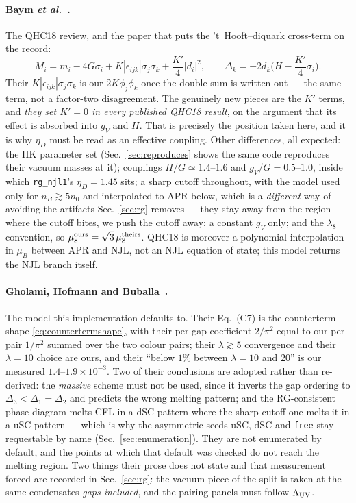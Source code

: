 \documentclass[aps,prc,onecolumn,superscriptaddress,nofootinbib,10pt]{revtex4-2}
\newcommand{\nB}{n_B}
\newcommand{\muB}{\mu_B}
\newcommand{\Lam}{\Lambda}
\begin{document}
\paragraph{Baym \textit{et al.}~\cite{Baym2018}.} The QHC18 review, and the
paper that puts the 't~Hooft--diquark cross-term on the record:
\begin{equation}
  M_i = m_i - 4G\sigma_i + K|\epsilon_{ijk}|\sigma_j\sigma_k
        + \frac{K'}{4}|d_i|^2 , \qquad
  \Delta_k = -2d_k\Big(H - \frac{K'}{4}\sigma_i\Big) .
\end{equation}
Their $K|\epsilon_{ijk}|\sigma_j\sigma_k$ is our $2K\phi_j\phi_k$ once the
double sum is written out --- the same term, not a factor-two disagreement.
The genuinely new pieces are the $K'$ terms, and \emph{they set $K' = 0$ in
every published QHC18 result}, on the argument that its effect is absorbed into
$g_V$ and $H$. That is precisely the position taken here, and it is why
$\eta_D$ must be read as an effective coupling. Other differences, all
expected: the HK parameter set (Sec.~\ref{sec:reproduces} shows the same code
reproduces their vacuum masses at it); couplings $H/G \simeq 1.4$--$1.6$ and
$g_V/G = 0.5$--$1.0$, inside which \texttt{rg\_njl1}'s $\eta_D = 1.45$ sits; a
sharp cutoff throughout, with the model used only for $\nB \gtrsim 5n_0$ and
interpolated to APR below, which is a \emph{different} way of avoiding the
artifacts Sec.~\ref{sec:rg} removes --- they stay away from the region where
the cutoff bites, we push the cutoff away; a constant $g_V$ only; and the
$\lambda_8$ convention, so $\mu_8^{\rm ours} = \sqrt3\,\mu_8^{\rm theirs}$.
QHC18 is moreover a polynomial interpolation in $\muB$ between APR and NJL, not
an NJL equation of state; this model returns the NJL branch itself.

\paragraph{Gholami, Hofmann and Buballa~\cite{Gholami2024}.} The model this
implementation defaults to. Their Eq.~(C7) is the counterterm shape
\eqref{eq:countertermshape}, with their per-gap coefficient $2/\pi^2$ equal to our
per-pair $1/\pi^2$ summed over the two colour pairs; their
$\lambda \gtrsim 5$ convergence and their $\lambda = 10$ choice are ours, and
their ``below $1\%$ between $\lambda = 10$ and $20$'' is our measured
$1.4$--$1.9\times10^{-3}$. Two of their conclusions are adopted rather than
re-derived: the \emph{massive} scheme must not be used, since it inverts the
gap ordering to $\Delta_3 < \Delta_1 = \Delta_2$ and predicts the wrong melting
pattern; and the RG-consistent phase diagram melts CFL in a dSC pattern where
the sharp-cutoff one melts it in a uSC pattern --- which is why the asymmetric
seeds uSC, dSC and \texttt{free} stay requestable by name
(Sec.~\ref{sec:enumeration}). They are not enumerated by default, and the
points at which that default was checked do not reach the melting region. Two
things their prose does not state and that measurement forced are recorded in
Sec.~\ref{sec:rg}: the vacuum piece of the split is taken at the same
condensates \emph{gaps included}, and the pairing panels must follow
$\Lam_{\rm UV}$.
\end{document}
